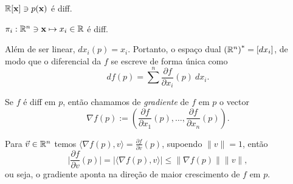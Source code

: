 \begin{example}
    \(\mathbb{R}[\textbf{x}] \ni p(\textbf{x})\) é diff. 
\end{example}
\begin{example}
    \(\pi_i: \mathbb{R}^n \ni \textbf{x} \mapsto x_i \in \mathbb{R} \) é diff.  %
\end{example}
\begin{note}
    Além de ser linear, \(dx_i(p) = x_i \). Portanto, o espaço dual \({(\mathbb{R}^n)}^*=[dx_i]\), de modo que o diferencial da \(f\) se escreve de forma única como    
    \[df(p) = \sum^n \frac{\partial f }{\partial x_i}(p) \ dx_i. \]
\end{note}

\Ef

\begin{definition}
    Se \(f\) é diff em \(p\), então chamamos de \emph{gradiente} de \(f\) em \(p\) o vector 
    \[\nabla f(p) := \left(\frac{\partial f}{\partial x_1}(p),\ldots,\frac{\partial f}{\partial x_n}(p)\right). \]
\end{definition}

\begin{note}
    Para \(\vec{v}\in \mathbb{R}^n\) temos \(\langle \nabla f(p) , v\rangle = \frac{\partial f}{\partial v}(p)\), supoendo \(\|v\|=1\), então 
    \[\Big|\frac{\partial f}{\partial v}(p)\Big| = |\langle \nabla f (p), v\rangle| \leq \|\nabla f(p)\|\|v\|,\]
    ou seja, o gradiente aponta na direção de maior crescimento de \(f\) em \(p\).  
\end{note}

